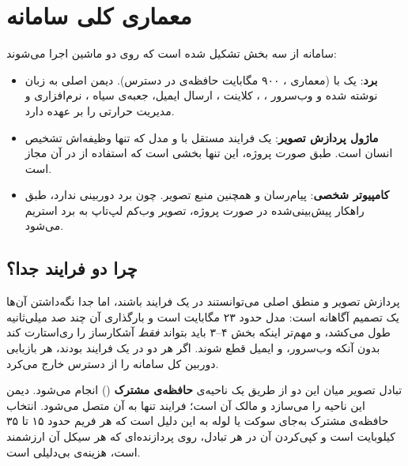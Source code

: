 
\section{معماری کلی سامانه}

سامانه از سه بخش تشکیل شده است که روی دو ماشین اجرا می‌شوند:

\begin{itemize}
	\item \textbf{برد}: یک  با  (معماری ، ۹۰۰ مگابایت حافظه‌ی در دسترس). دیمن اصلی به زبان  نوشته شده و وب‌سرور ، ، کلاینت ، ارسال ایمیل، جعبه‌ی سیاه ،  نرم‌افزاری و مدیریت حرارتی را بر عهده دارد.
	\item \textbf{ماژول پردازش تصویر}: یک فرایند مستقل  با  و مدل  که تنها وظیفه‌اش تشخیص انسان است. طبق صورت پروژه، این تنها بخشی است که استفاده از  در آن مجاز است.
	\item \textbf{کامپیوتر شخصی}:  پیام‌رسان  و همچنین منبع تصویر. چون برد دوربینی ندارد، طبق راهکار پیش‌بینی‌شده در صورت پروژه، تصویر وب‌کم لپ‌تاپ به برد استریم می‌شود.
\end{itemize}

\subsection{چرا دو فرایند جدا؟}

پردازش تصویر و منطق اصلی می‌توانستند در یک فرایند باشند، اما جدا نگه‌داشتن آن‌ها یک تصمیم آگاهانه است: مدل  حدود ۲۳ مگابایت است و بارگذاری آن چند صد میلی‌ثانیه طول می‌کشد، و مهم‌تر اینکه  بخش ۴--۳ باید بتواند \emph{فقط} آشکارساز را ری‌استارت کند بدون آنکه وب‌سرور،  و ایمیل قطع شوند. اگر هر دو در یک فرایند بودند، هر بازیابی دوربین کل سامانه را از دسترس خارج می‌کرد.

تبادل تصویر میان این دو از طریق یک ناحیه‌ی \textbf{حافظه‌ی مشترک} () انجام می‌شود. دیمن  این ناحیه را می‌سازد و مالک آن است؛ فرایند  تنها به آن متصل می‌شود. انتخاب حافظه‌ی مشترک به‌جای سوکت یا لوله به این دلیل است که هر فریم  حدود ۱۵ تا ۳۵ کیلوبایت است و کپی‌کردن آن در هر تبادل، روی پردازنده‌ای که هر سیکل آن ارزشمند است، هزینه‌ی بی‌دلیلی است.

